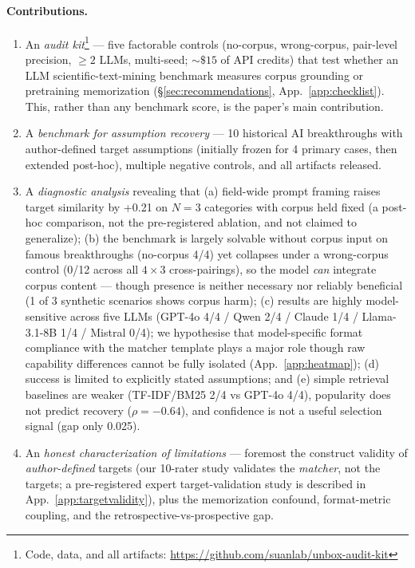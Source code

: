 \documentclass[11pt]{article}
\begin{document}
\paragraph{Contributions.}
\begin{enumerate}[leftmargin=*,nosep]
    \item An \emph{audit kit}\footnote{Code, data, and all artifacts: \url{https://github.com/suanlab/unbox-audit-kit}} --- five factorable controls (no-corpus, wrong-corpus, pair-level precision, ${\geq}2$ LLMs, multi-seed; ${\sim}\$15$ of API credits) that test whether an LLM scientific-text-mining benchmark measures corpus grounding or pretraining memorization (\S\ref{sec:recommendations}, App.~\ref{app:checklist}). This, rather than any benchmark score, is the paper's main contribution.
    \item A \emph{benchmark for assumption recovery} --- 10 historical AI breakthroughs with author-defined target assumptions (initially frozen for 4 primary cases, then extended post-hoc), multiple negative controls, and all artifacts released.
    \item A \emph{diagnostic analysis} revealing that (a) field-wide prompt framing raises target similarity by +0.21 on $N=3$ categories with corpus held fixed (a post-hoc comparison, not the pre-registered ablation, and not claimed to generalize); (b) the benchmark is largely solvable without corpus input on famous breakthroughs (no-corpus 4/4) yet collapses under a wrong-corpus control (0/12 across all $4{\times}3$ cross-pairings), so the model \emph{can} integrate corpus content --- though presence is neither necessary nor reliably beneficial (1 of 3 synthetic scenarios shows corpus harm); (c) results are highly model-sensitive across five LLMs (GPT-4o 4/4 / Qwen 2/4 / Claude 1/4 / Llama-3.1-8B 1/4 / Mistral 0/4); we hypothesise that model-specific format compliance with the matcher template plays a major role though raw capability differences cannot be fully isolated (App.~\ref{app:heatmap}); (d) success is limited to explicitly stated assumptions; and (e) simple retrieval baselines are weaker (TF-IDF/BM25 2/4 vs GPT-4o 4/4), popularity does not predict recovery ($\rho = -0.64$), and confidence is not a useful selection signal (gap only 0.025).
    \item An \emph{honest characterization of limitations} --- foremost the construct validity of \emph{author-defined} targets (our 10-rater study validates the \emph{matcher}, not the targets; a pre-registered expert target-validation study is described in App.~\ref{app:targetvalidity}), plus the memorization confound, format-metric coupling, and the retrospective-vs-prospective gap.
\end{enumerate}
\end{document}
